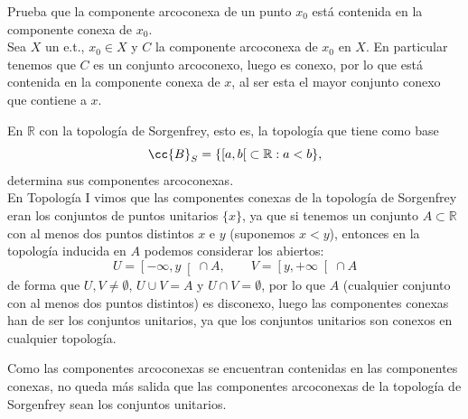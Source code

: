 \begin{ejercicio}
    Prueba que la componente arcoconexa de un punto $x_0$ está contenida en la componente conexa de $x_0$.\\

    \noindent
    Sea $X$ un e.t., $x_0\in X$ y $C$ la componente arcoconexa de $x_0$ en $X$. En particular tenemos que $C$ es un conjunto arcoconexo, luego es conexo, por lo que está contenida en la componente conexa de $x$, al ser esta el mayor conjunto conexo que contiene a $x$.
\end{ejercicio}

\begin{ejercicio}
    En $\mathbb{R}$ con la topología de Sorgenfrey, esto es, la topología que tiene como base
    \begin{equation*}
        \cc{B}_S = \{\left[a,b\right[ \subset \mathbb{R} : a<b\},
    \end{equation*}
    determina sus componentes arcoconexas.\\

    \noindent
    En Topología I vimos que las componentes conexas de la topología de Sorgenfrey eran los conjuntos de puntos unitarios $\{x\}$, ya que si tenemos un conjunto $A\subset \mathbb{R}$ con al menos dos puntos distintos $x$ e $y$ (suponemos $x<y$), entonces en la topología inducida en $A$ podemos considerar los abiertos:
    \begin{equation*}
        U = \left[-\infty,y\right[\cap A, \qquad V = \left[y,+\infty\right[\cap A
    \end{equation*}
    de forma que $U,V\neq \emptyset $, $U\cup V = A$ y $U\cap V = \emptyset $, por lo que $A$ (cualquier conjunto con al menos dos puntos distintos) es disconexo, luego las componentes conexas han de ser los conjuntos unitarios, ya que los conjuntos unitarios son conexos en cualquier topología.

    Como las componentes arcoconexas se encuentran contenidas en las componentes conexas, no queda más salida que las componentes arcoconexas de la topología de Sorgenfrey sean los conjuntos unitarios.
\end{ejercicio}

